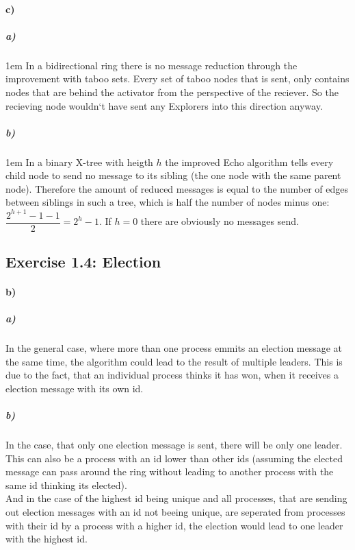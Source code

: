 \documentclass[12pt,a4paper]{article}
\begin{document}
\paragraph{c)}

\subparagraph{a)}
\begingroup
\leftskip1em
In a bidirectional ring there is no message reduction through the improvement with taboo sets. Every set of taboo nodes that is sent, only contains nodes that are behind the activator from the perspective of the reciever. So the recieving node wouldn`t have sent any Explorers into this direction anyway.
\par
\endgroup
\subparagraph{b)}

\begingroup
\leftskip1em
In a binary X-tree with heigth $h$ the improved Echo algorithm tells every child node to send no message to its sibling (the one node with the same parent node). Therefore the amount of reduced messages is equal to the number of edges between siblings in such a tree, which is half the number of nodes minus one: $\dfrac{2^{h+1}-1-1}{2}=2^{h}-1$. If $h=0$ there are obviously no messages send.
\par
\endgroup

\subsection*{Exercise 1.4: Election}
\paragraph{b)} %
	\subparagraph{a)} %
	In the general case, where more than one process emmits an election message at the same time, the algorithm could lead to the result of multiple leaders. This is due to the fact, that an individual process thinks it has won, when it receives a election message with its own id.
	\subparagraph{b)} %
	In the case, that only one election message is sent, there will be only one leader. This can also be a process with an id lower than other ids (assuming the elected message can pass around the ring without leading to another process with the same id thinking its elected).\\
	And in the case of the highest id being unique and all processes, that are sending out election messages with an id not beeing unique, are seperated from processes with their id by a process with a higher id, the election would lead to one leader with the highest id.
\end{document}
